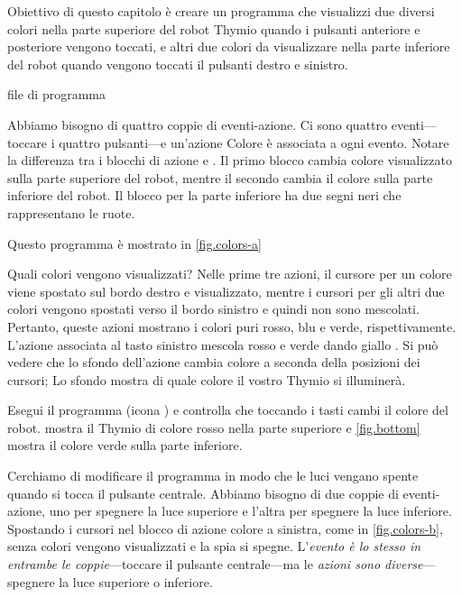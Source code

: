
\label{ch.colors}


Obiettivo di questo capitolo è creare un programma che visualizzi due diversi colori nella parte superiore del robot Thymio quando i pulsanti anteriore e posteriore vengono toccati, e altri due colori da visualizzare nella parte inferiore del robot
quando vengono toccati il pulsanti destro e sinistro.

{\raggedleft \hfill file di programma }

Abbiamo bisogno di quattro coppie di eventi-azione.
Ci sono quattro eventi---toccare i
quattro pulsanti---e un'azione Colore è associata a ogni evento. Notare la
differenza tra i blocchi di azione  e
. Il primo blocco cambia colore
visualizzato sulla parte superiore del robot, mentre il secondo cambia il colore sulla
parte inferiore del robot. Il blocco per la parte inferiore ha due segni neri
che rappresentano le ruote.

Questo programma è mostrato in \cref{fig.colors-a}

Quali colori vengono visualizzati? Nelle prime tre azioni, il cursore per
un colore viene spostato sul bordo destro e visualizzato, mentre i cursori
per gli altri due colori vengono spostati verso il bordo sinistro e quindi non sono mescolati. Pertanto, queste azioni mostrano i colori puri rosso, blu e verde,
rispettivamente. L'azione associata al tasto sinistro mescola rosso e verde
dando giallo .
Si può vedere che lo sfondo dell'azione cambia colore a seconda della
posizioni dei cursori; Lo sfondo mostra di quale colore il vostro Thymio si illuminerà.

Esegui il programma (icona ) e controlla che toccando i tasti cambi il colore del robot.
 mostra il Thymio di colore rosso
nella parte superiore e \cref{fig.bottom} mostra il colore verde sulla parte
inferiore.




Cerchiamo di modificare il programma in modo che le luci vengano spente quando si tocca il
pulsante centrale. Abbiamo bisogno di due coppie di eventi-azione, uno per spegnere la luce superiore e l'altra per spegnere la luce inferiore.
Spostando i cursori nel blocco di azione colore a sinistra, come in \cref{fig.colors-b}, senza colori vengono visualizzati e la spia si spegne.
L'\emph{evento è lo stesso in entrambe le coppie}---toccare il pulsante centrale---ma
le \emph{azioni sono diverse}---spegnere la luce superiore o inferiore.

